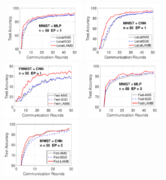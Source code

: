 \documentclass[11pt]{article}
\begin{document}
\begin{figure}[t!]
    \begin{center}
        \mbox{
        \hspace{-0.1in}\includegraphics[width=0.35\textwidth]{new_fmnist_mnist_fig/mnist_testerror_mlp_ep1_iid0.pdf}
        \hspace{-0.1in}\includegraphics[width=0.35\textwidth]{new_fmnist_mnist_fig/mnist_testerror_cnn_ep1_iid0.pdf}
        \hspace{-0.1in}\includegraphics[width=0.35\textwidth]{new_fmnist_mnist_fig/fmnist_testerror_cnn_ep1_iid0.pdf}
        }
        \mbox{
        \hspace{-0.1in}\includegraphics[width=0.35\textwidth]{new_figure/mnist_testerror_mlp_ep5_client50_iid0.pdf}
        \hspace{-0.1in}\includegraphics[width=0.35\textwidth]{new_figure/mnist_testerror_cnn_ep5_client50_iid0.pdf}
}
\end{center}
\end{figure}
\end{document}
